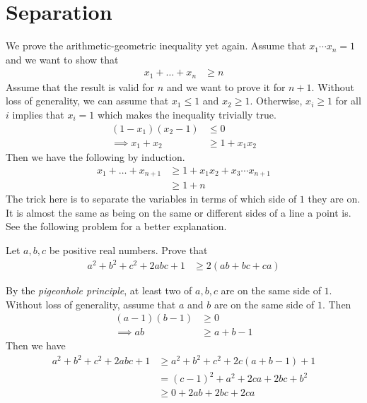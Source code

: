 \documentclass[inequalities.tex]{subfile}
\begin{document}
	\section{Separation}
	We prove the arithmetic-geometric inequality yet again. Assume that $x_{1}\cdots x_{n}=1$ and we want to show that
		\begin{align*}
			x_{1}+\ldots+x_{n}
				& \geq n
		\end{align*}
	Assume that the result is valid for $n$ and we want to prove it for $n+1$. Without loss of generality, we can assume that $x_{1}\leq 1$ and $x_{2}\geq 1$. Otherwise, $x_{i}\geq 1$ for all $i$ implies that $x_{i}=1$ which makes the inequality trivially true.
		\begin{align*}
			(1-x_{1})(x_{2}-1)
				& \leq 0\\
			\implies x_{1}+x_{2}
				& \geq 1+x_{1}x_{2}
		\end{align*}
	Then we have the following by induction.
		\begin{align*}
			x_{1}+\ldots+x_{n+1}
				& \geq 1+x_{1}x_{2}+x_{3}\cdots x_{n+1}\\
				& \geq 1+n
		\end{align*}
	The trick here is to separate the variables in terms of which side of $1$ they are on. It is almost the same as being on the same or different sides of a line a point is. See the following problem for a better explanation.
		\begin{problem}
			Let $a,b,c$ be positive real numbers. Prove that
				\begin{align*}
					a^{2}+b^{2}+c^{2}+2abc+1
						& \geq 2(ab+bc+ca)
				\end{align*}
			
				\begin{solution}
					By the \textit{pigeonhole principle}, at least two of $a,b,c$ are on the same side of $1$. Without loss of generality, assume that $a$ and $b$ are on the same side of $1$. Then
						\begin{align*}
							(a-1)(b-1)
								& \geq 0\\
							\implies ab
								& \geq a+b-1
						\end{align*}
					Then we have
						\begin{align*}
							a^{2}+b^{2}+c^{2}+2abc+1
								& \geq a^{2}+b^{2}+c^{2}+2c(a+b-1)+1\\
								& = (c-1)^{2}+a^{2}+2ca+2bc+b^{2}\\
								& \geq 0+2ab+2bc+2ca
						\end{align*}
				\end{solution}
		\end{problem}
	
\end{document}
